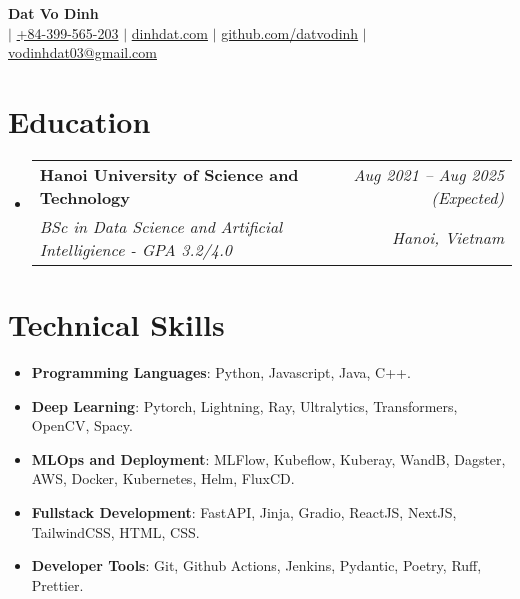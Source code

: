 \documentclass[letterpaper,11pt]{article}
\makeatletter
\newcommand{\resumeitem}[1]{
  \item \small{
    \hspace{1pt} #1 \vspace{-1pt}
  }
}
\newcommand{\resumeSubheading}[4]{
  \vspace{-1pt}\item
    \begin{tabular*}{0.97\textwidth}[t]{l@{\extracolsep{\fill}}r}
      \textbf{#1} & \textit{\small #2} \\
      \textit{\small #3} & \textit{\small #4} \\
    \end{tabular*}\vspace{-6pt}
}
\newcommand{\resumeSubHeadingListStart}{\begin{itemize}[leftmargin=*,label={}]}
\newcommand{\resumeSubHeadingListEnd}{\end{itemize}}
\newcommand{\resumeItemListStart}{\begin{itemize}}
\newcommand{\resumeItemListEnd}{\end{itemize}\vspace{-5pt}}
\makeatother
\begin{document}
\begin{center}
  \textbf{\Huge {Dat Vo Dinh}} \\ \vspace{4pt}
   $|$ \href{tel:+84399565203}{{+84-399-565-203}} $|$ \href{https://dinhdat.com}{{dinhdat.com}}
  $|$ \href{https://github.com/datvodinh/}{{github.com/datvodinh}} $|$ \href{mailto:vodinhdat03@gmail.com}{{vodinhdat03@gmail.com}}
\end{center}

\section{Education}
\resumeSubHeadingListStart
  \resumeSubheading
    {Hanoi University of Science and Technology}{Aug 2021 -- Aug 2025 (Expected)}
    {BSc in Data Science and Artificial Intelligience - GPA 3.2/4.0}{\textit{Hanoi, Vietnam}}
\resumeSubHeadingListEnd

  
\section{Technical Skills}
\resumeItemListStart[leftmargin=2pt,label={}]
  \resumeitem{\textbf{Programming Languages}: {Python, Javascript, Java, C++.}} \\[-\baselineskip]
  \resumeitem{\textbf{Deep Learning}: {Pytorch, Lightning, Ray, Ultralytics, Transformers, OpenCV, Spacy.}} \\[-\baselineskip]
  \resumeitem{\textbf{MLOps and Deployment}: {MLFlow, Kubeflow, Kuberay, WandB, Dagster, AWS, Docker, Kubernetes, Helm, FluxCD.}} \\[-\baselineskip]
  \resumeitem{\textbf{Fullstack Development}: {FastAPI, Jinja, Gradio, ReactJS, NextJS, TailwindCSS, HTML, CSS.}} \\[-\baselineskip]
  \resumeitem{\textbf{Developer Tools}: {Git, Github Actions, Jenkins, Pydantic, Poetry, Ruff, Prettier.}} \\[-\baselineskip]
\resumeItemListEnd

\end{document}
